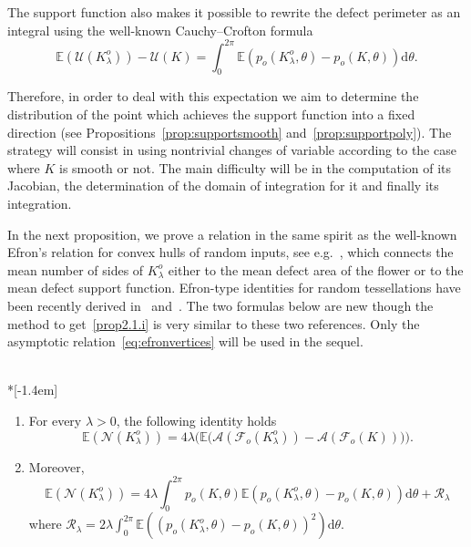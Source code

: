 \documentclass[10pt]{amsart}
\theoremstyle{definition}\newtheorem{defi}[theo]{Definition}\newtheorem{rema}[theo]{Remark}\newtheorem{exam}[theo]{Example}\newtheorem{exem}[theo]{Example}\newtheorem{nota}[theo]{Notation}
\newcommand{\cA}{\mathcal{A}}
\newcommand{\cF}{\mathcal{F}}
\newcommand{\cN}{\mathcal{N}}
\newcommand{\cR}{\mathcal{R}}
\newcommand{\cU}{\mathcal{U}}
\newcommand{\dd}{\mathrm{d}}
\newcommand{\E}{\mathbb{E}}
\newcommand{\pass}{\vspace{0.3cm}\noindent}
\newcommand{\noi}{\noindent}
\newcommand*{\romanenumi}{\renewcommand*{\theenumi}{\roman{enumi}}}
\begin{document}
The support function also makes it possible to rewrite the defect perimeter as an integral using the well-known Cauchy--Crofton formula
\begin{equation}\label{eq:croftonperimeter}
\E(\cU(K_{\lambda}^o))-\cU(K)=\int_0^{2\pi} \E(p_o(K_{\lambda}^o,\theta)-p_o(K,\theta))\dd\theta.
\end{equation}

Therefore, in order to deal with this expectation we aim to determine the distribution of the point which achieves the support function into a fixed direction (see Propositions~\ref{prop:supportsmooth} and~\ref{prop:supportpoly}). The strategy will consist in using nontrivial changes of variable according to the case where $K$ is smooth or not. The main difficulty will be in the computation of its Jacobian, the determination of the domain of integration for it and finally its integration.

In the next proposition, we prove a relation in the same spirit as the well-known Efron's relation for convex hulls of random inputs, see e.g.~\cite{Efron}, which connects the mean number of sides of $K_{\lambda}^o$ either to the mean defect area of the flower or to the mean defect support function. Efron-type identities for random tessellations have been recently derived in~\cite[Section~5]{Sch09} and~\cite[Theorem~3.1]{hhrt}. The two formulas below are new though the method to get~\eqref{prop2.1.i} is very similar to these two references. Only the asymptotic relation~\eqref{eq:efronvertices} will be used in the sequel.

\begin{prop}\label{prop:efron}\ \\*[-1.4em]
\begin{enumerate}\romanenumi
\item \label{prop2.1.i}For every $\lambda>0$, the following identity holds
\begin{equation*}
\E(\cN(K_{\lambda}^o)) = 4\lambda \big(\E\big(\cA(\cF_o(K_{\lambda}^o))-\cA(\cF_o(K))\big)\big).
\end{equation*}
\item \label{prop2.1.ii}Moreover,
\begin{equation}\label{eq:efronvertices}
\E(\cN(K_{\lambda}^o))= 4\lambda\int_0^{2\pi}p_o(K,\theta)\E(p_o(K_{\lambda}^o,\theta)-p_o(K,\theta))\dd\theta+{\cR}_\lambda
\end{equation}
where ${\cR}_\lambda=2\lambda\int_0^{2\pi}\E\left((p_o(K_{\lambda}^o,\theta)-p_o(K,\theta))^2\right)\dd\theta$.
\end{enumerate}
\end{prop}
\end{document}
